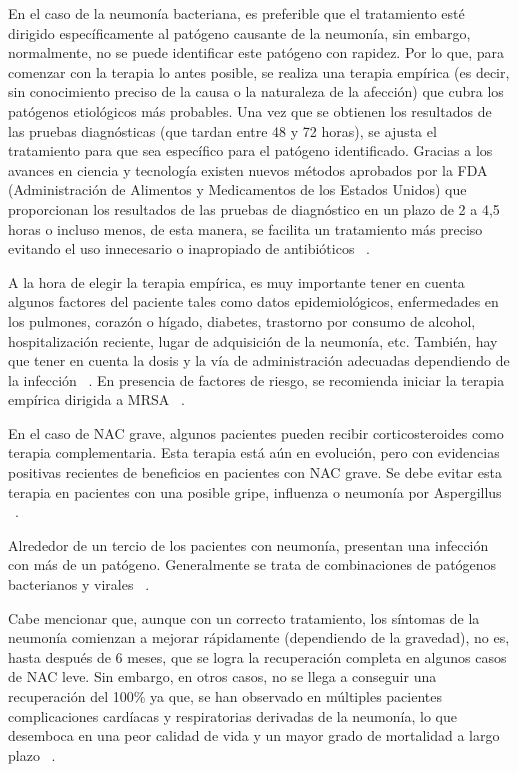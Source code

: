 En el caso de la neumonía bacteriana, es preferible que el tratamiento esté dirigido específicamente al patógeno causante de la neumonía, sin embargo, normalmente, no se puede identificar este patógeno con rapidez. Por lo que, para comenzar con la terapia lo antes posible, se realiza una terapia empírica (es decir, sin conocimiento preciso de la causa o la naturaleza de la afección) que cubra los patógenos etiológicos más probables. Una vez que se obtienen los resultados de las pruebas diagnósticas (que tardan entre 48 y 72 horas), se ajusta el tratamiento para que sea específico para el patógeno identificado. Gracias a los avances en ciencia y tecnología existen nuevos métodos aprobados por la FDA (Administración de Alimentos y Medicamentos de los Estados Unidos) que proporcionan los resultados de las pruebas de diagnóstico en un plazo de 2 a 4,5 horas o incluso menos, de esta manera, se facilita un tratamiento más preciso evitando el uso innecesario o inapropiado de antibióticos ~\cite{antoni2021}.

A la hora de elegir la terapia empírica, es muy importante tener en cuenta algunos factores del paciente tales como datos epidemiológicos, enfermedades en los pulmones, corazón o hígado, diabetes, trastorno por consumo de alcohol, hospitalización reciente, lugar de adquisición de la neumonía, etc. También, hay que tener en cuenta la dosis y la vía de administración adecuadas dependiendo de la infección ~\cite{antoni2021}.  En presencia de factores de riesgo, se recomienda iniciar la terapia empírica dirigida a MRSA ~\cite{file2023community}.

En el caso de NAC grave, algunos pacientes pueden recibir corticosteroides como terapia complementaria. Esta terapia está aún en evolución, pero con evidencias positivas recientes de beneficios en pacientes con NAC grave. Se debe evitar esta terapia en pacientes con una posible gripe, influenza o neumonía por Aspergillus ~\cite{file2023community}.

Alrededor de un tercio de los pacientes con neumonía, presentan una infección con más de un patógeno. Generalmente se trata de combinaciones de patógenos bacterianos y virales ~\cite{lim2022pneumonia}.

Cabe mencionar que, aunque con un correcto tratamiento, los síntomas de la neumonía comienzan a mejorar rápidamente (dependiendo de la gravedad), no es, hasta después de 6 meses, que se logra la recuperación completa en algunos casos de NAC leve. Sin embargo, en otros casos, no se llega a conseguir una recuperación del 100\% ya que, se han observado en múltiples pacientes complicaciones cardíacas y respiratorias derivadas de la neumonía, lo que desemboca en una peor calidad de vida y un mayor grado de mortalidad a largo plazo ~\cite{antoni2021}. 

